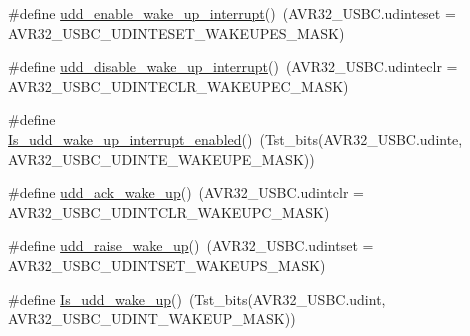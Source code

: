 \begin{DoxyCompactItemize}
\item 
\#define \hyperlink{group__udd__group_ga1b192f6b945ae10b536deca002c2a1aa}{udd\-\_\-enable\-\_\-wake\-\_\-up\-\_\-interrupt}()~(\-A\-V\-R32\-\_\-\-U\-S\-B\-C.\-udinteset = \-A\-V\-R32\-\_\-\-U\-S\-B\-C\-\_\-\-U\-D\-I\-N\-T\-E\-S\-E\-T\-\_\-\-W\-A\-K\-E\-U\-P\-E\-S\-\_\-\-M\-A\-S\-K)
\item 
\#define \hyperlink{group__udd__group_gaeac784d6d727d949449042d979d9a2ff}{udd\-\_\-disable\-\_\-wake\-\_\-up\-\_\-interrupt}()~(\-A\-V\-R32\-\_\-\-U\-S\-B\-C.\-udinteclr = \-A\-V\-R32\-\_\-\-U\-S\-B\-C\-\_\-\-U\-D\-I\-N\-T\-E\-C\-L\-R\-\_\-\-W\-A\-K\-E\-U\-P\-E\-C\-\_\-\-M\-A\-S\-K)
\item 
\#define \hyperlink{group__udd__group_gaeab0126ceda728b5e100675a1368219a}{\-Is\-\_\-udd\-\_\-wake\-\_\-up\-\_\-interrupt\-\_\-enabled}()~(\-Tst\-\_\-bits(\-A\-V\-R32\-\_\-\-U\-S\-B\-C.\-udinte, \-A\-V\-R32\-\_\-\-U\-S\-B\-C\-\_\-\-U\-D\-I\-N\-T\-E\-\_\-\-W\-A\-K\-E\-U\-P\-E\-\_\-\-M\-A\-S\-K))
\item 
\#define \hyperlink{group__udd__group_gadf64e48ecbcfc8082ac438156d43311d}{udd\-\_\-ack\-\_\-wake\-\_\-up}()~(\-A\-V\-R32\-\_\-\-U\-S\-B\-C.\-udintclr = \-A\-V\-R32\-\_\-\-U\-S\-B\-C\-\_\-\-U\-D\-I\-N\-T\-C\-L\-R\-\_\-\-W\-A\-K\-E\-U\-P\-C\-\_\-\-M\-A\-S\-K)
\item 
\#define \hyperlink{group__udd__group_ga6b5a8ee09140c447b077c66c2e7668fe}{udd\-\_\-raise\-\_\-wake\-\_\-up}()~(\-A\-V\-R32\-\_\-\-U\-S\-B\-C.\-udintset = \-A\-V\-R32\-\_\-\-U\-S\-B\-C\-\_\-\-U\-D\-I\-N\-T\-S\-E\-T\-\_\-\-W\-A\-K\-E\-U\-P\-S\-\_\-\-M\-A\-S\-K)
\item 
\#define \hyperlink{group__udd__group_ga27099aac5c46e62ca82775e957ae52a4}{\-Is\-\_\-udd\-\_\-wake\-\_\-up}()~(\-Tst\-\_\-bits(\-A\-V\-R32\-\_\-\-U\-S\-B\-C.\-udint, \-A\-V\-R32\-\_\-\-U\-S\-B\-C\-\_\-\-U\-D\-I\-N\-T\-\_\-\-W\-A\-K\-E\-U\-P\-\_\-\-M\-A\-S\-K))
\end{DoxyCompactItemize}

